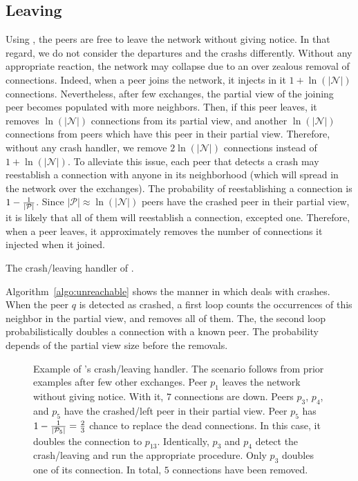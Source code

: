 \subsection{Leaving}
\label{subsec:leaving}

Using \SCAMPLON{}, the peers are free to leave the network without giving
notice. In that regard, we do not consider the departures and the crashs
differently.  Without any appropriate reaction, the network may collapse due to
an over zealous removal of connections. Indeed, when a peer joins the network,
it injects in it $1+\ln(|\mathcal{N}|)$ connections. Nevertheless, after few
exchanges, the partial view of the joining peer becomes populated with more
neighbors. Then, if this peer leaves, it removes $\ln(|\mathcal{N}|)$
connections from its partial view, and another $\ln(|\mathcal{N}|)$ connections
from peers which have this peer in their partial view. Therefore, without any
crash handler, we remove $2\ln(|\mathcal{N}|)$ connections instead of
$1+\ln(|\mathcal{N}|)$. To alleviate this issue, each peer that detects a crash
may reestablish a connection with anyone in its neighborhood (which will spread
in the network over the exchanges). The probability of reestablishing a
connection is $1-{1\over{|\mathcal{P}|}}$. Since
${|\mathcal{P}|}\approx \ln(|\mathcal{N}|)$ peers have the crashed peer in
their partial view, it is likely that all of them will reestablish a
connection, excepted one. Therefore, when a peer leaves, it approximately
removes the number of connections it injected when it joined.

\begin{algorithm}
  
  \caption{\label{algo:unreachable}The crash/leaving handler of \SCAMPLON{}.}
\end{algorithm}

Algorithm~\ref{algo:unreachable} shows the manner in which \SCAMPLON{} deals
with crashes. When the peer $q$ is detected as crashed, a first loop counts the
occurrences of this neighbor in the partial view, and removes all of them. The,
the second loop probabilistically doubles a connection with a known peer. The
probability depends of the partial view size before the removals.

\begin{figure}
  
  \caption{\label{fig:crashexample}Example of \SCAMPLON{}'s crash/leaving
    handler. The scenario follows from prior examples after few other
    exchanges. Peer $p_1$ leaves the network without giving notice. With it,
    $7$ connections are down. Peers $p_3$, $p_4$, and $p_5$ have the
    crashed/left peer in their partial view. Peer $p_5$ has
    $1-{1\over{|\mathcal{P}_5|}}={2\over{3}}$ chance to replace the dead
    connections. In this case, it doubles the connection to
    $p_{13}$. Identically, $p_3$ and $p_4$ detect the crash/leaving and run the
    appropriate procedure. Only $p_3$ doubles one of its connection. In total,
    $5$ connections have been removed.}
\end{figure}

